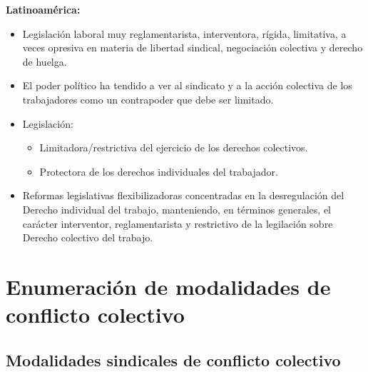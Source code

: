 \documentclass[spanish,12pt,a4paper,titlepage]{report}
\begin{document}
\textbf{Latinoamérica:}

\begin{itemize}
\item Legislación laboral muy reglamentarista, interventora, rígida, limitativa, a veces opresiva en materia de libertad sindical, negociación colectiva y derecho de huelga. 
\item El poder político ha tendido a ver al sindicato y a la acción colectiva de los trabajadores como un contrapoder que debe ser limitado.
\item Legislación:
  \begin{itemize}
  \item Limitadora/restrictiva del ejercicio de los derechos colectivos.
  \item Protectora de los derechos individuales del trabajador.
  \end{itemize}
\item Reformas legislativas flexibilizadoras concentradas en la desregulación del Derecho individual del trabajo, manteniendo, en términos generales, el carácter interventor, reglamentarista y restrictivo de la legilación sobre Derecho colectivo del trabajo. 
\end{itemize}

\section{Enumeración de modalidades de conflicto colectivo}
\label{sec:Enumeracion-de-modalidades-de-conflicto-colectivo}

\subsection{Modalidades sindicales de conflicto colectivo}
\label{sec:Modalidades-sindicales-de-conflicto-colectivo}
\end{document}
